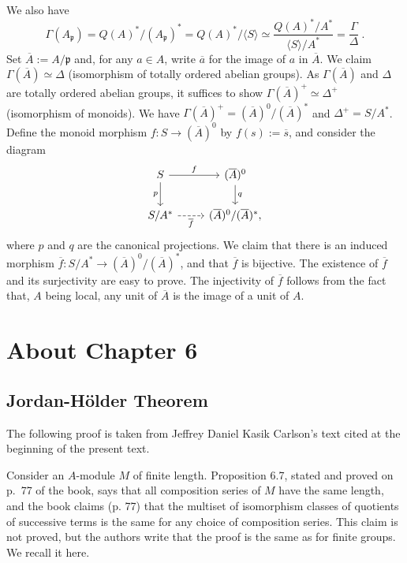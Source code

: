\documentclass[parskip=half,fontsize=12pt]{scrartcl}%
\newcommand{\mf}{\mathfrak}
\newcommand{\ppp}{\mf p}
\begin{document}
We also have 
$$
\Gamma(A_\ppp)=Q(A)^*/(A_\ppp)^*=Q(A)^*/\langle S\rangle\simeq\frac{Q(A)^*/A^*}{\langle S\rangle/A^*}=\frac{\Gamma}{\Delta}\ .
$$ 
Set $\overline A:=A/\ppp$ and, for any $a\in A$, write $\overline a$ for the image of $a$ in $\overline A$. We claim $\Gamma(\overline A)\simeq\Delta$ (isomorphism of totally ordered abelian groups). As $\Gamma(\overline A)$ and $\Delta$ are totally ordered abelian groups, it suffices to show $\Gamma(\overline A)^+\simeq\Delta^+$ (isomorphism of monoids). We have $\Gamma(\overline A)^+=(\overline A)^0/(\overline A)^*$ and $\Delta^+=S/A^*$. Define the monoid morphism $f:S\to(\overline A)^0$ by $f(s):=\overline s$, and consider the diagram 
$$
\begin{tikzcd}
S\ar[r,"f"]\ar[d,"p"']&(\overline A)^0\ar[d,"q"]\\ 
S/A^*\ar[r,dashrightarrow,"\overline f"']&(\overline A)^0/(\overline A)^*,
\end{tikzcd}
$$ 
where $p$ and $q$ are the canonical projections. We claim that there is an induced morphism $\overline f:S/A^*\to(\overline A)^0/(\overline A)^*$, and that $\overline f$ is bijective. The existence of $\overline f$ and its surjectivity are easy to prove. The injectivity of $\overline f$ follows from the fact that, $A$ being local, any unit of $\overline A$ is the image of a unit of $A$.

\section{About Chapter 6}%

\subsection{Jordan-Hölder Theorem}%

The following proof is taken from Jeffrey Daniel Kasik Carlson's text cited at the beginning of the present text. 

Consider an $A$-module $M$ of finite length. Proposition 6.7, stated and proved on p.~77 of the book, says that all composition series of $M$ have the same length, and the book claims (p. 77) that the multiset of isomorphism classes of quotients of successive terms is the same for any choice of composition series. This claim is not proved, but the authors write that the proof is the same as for finite groups. We recall it here. 
\end{document}
